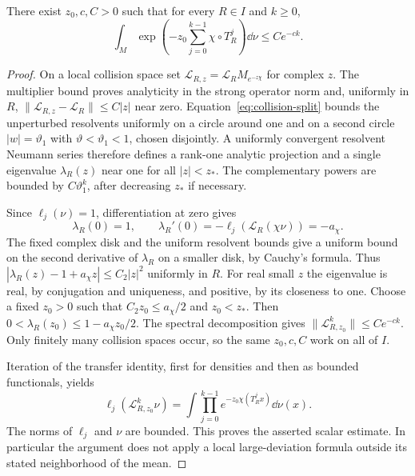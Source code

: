 \begin{proposition}
\label{prop:soft-killing}
There exist $z_0,c,C>0$ such that for every $R\in I$ and $k\ge0$,
\begin{equation}\label{eq:soft-killing}
 \int_M\exp\left(-z_0\sum_{j=0}^{k-1}\chi\circ T_R^j\right)\dd\nu
       \le Ce^{-ck}.
\end{equation}
\end{proposition}
\begin{proof}
On a local collision space set
$\mathcal L_{R,z}=\mathcal L_R M_{e^{-z\chi}}$ for complex $z$.
The multiplier bound proves analyticity in the strong operator norm and,
uniformly in $R$, $\|\mathcal L_{R,z}-\mathcal L_R\|\le C|z|$ near
zero. Equation~\eqref{eq:collision-split} bounds the unperturbed
resolvents uniformly on a circle around one and on a second circle
$|w|=\vartheta_1$ with $\vartheta<\vartheta_1<1$, chosen disjointly.
A uniformly convergent resolvent Neumann series therefore defines a
rank-one analytic projection and a single eigenvalue $\lambda_R(z)$
near one for all $|z|<z_*$. The complementary powers are bounded by
$C\vartheta_1^k$, after decreasing $z_*$ if necessary.

Since $\ell_j(\nu)=1$, differentiation at zero gives
\[
 \lambda_R(0)=1,\qquad
 \lambda_R'(0)=-\ell_j(\mathcal L_R(\chi\nu))=-a_\chi.
\]
The fixed complex disk and the uniform resolvent bounds give a uniform
bound on the second derivative of $\lambda_R$ on a smaller disk, by
Cauchy's formula. Thus
$|\lambda_R(z)-1+a_\chi z|\le C_2|z|^2$ uniformly in $R$.
For real small $z$ the eigenvalue is real, by conjugation and uniqueness,
and positive, by its closeness to one. Choose a fixed $z_0>0$ such that
$C_2z_0\le a_\chi/2$ and $z_0<z_*$. Then
$0<\lambda_R(z_0)\le1-a_\chi z_0/2$. The spectral decomposition gives
$\|\mathcal L_{R,z_0}^k\|\le Ce^{-ck}$. Only finitely many collision
spaces occur, so the same $z_0,c,C$ work on all of $I$.

Iteration of the transfer identity, first for densities and then as
bounded functionals, yields
\[
 \ell_j(\mathcal L_{R,z_0}^k\nu)
 =\int\prod_{j=0}^{k-1}e^{-z_0\chi(T_R^j x)}\dd\nu(x).
\]
The norms of $\ell_j$ and $\nu$ are bounded. This proves the asserted
scalar estimate. In particular the argument does not apply a local
large-deviation formula outside its stated neighborhood of the mean.
\end{proof}

